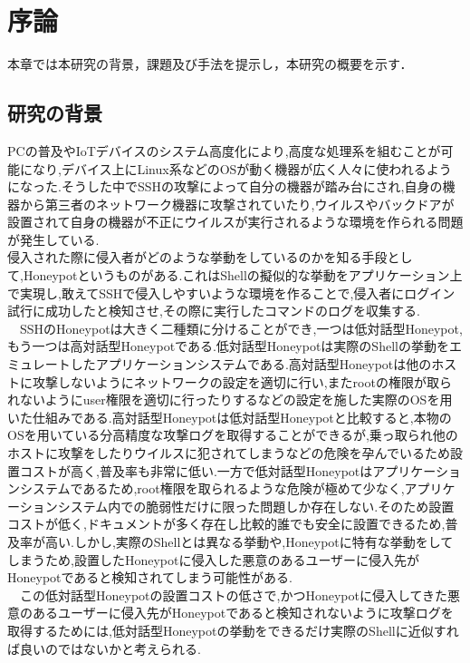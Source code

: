 \chapter{序論}
\label{introduction}

本章では本研究の背景，課題及び手法を提示し，本研究の概要を示す．

\section{研究の背景}
\label{introduction:haikei}

PCの普及やIoTデバイスのシステム高度化により,高度な処理系を組むことが可能になり,デバイス上にLinux系などのOSが動く機器が広く人々に使われるようになった.そうした中でSSHの攻撃によって自分の機器が踏み台にされ,自身の機器から第三者のネットワーク機器に攻撃されていたり,ウイルスやバックドアが設置されて自身の機器が不正にウイルスが実行されるような環境を作られる問題が発生している.\\
 侵入された際に侵入者がどのような挙動をしているのかを知る手段として,Honeypotというものがある.これはShellの擬似的な挙動をアプリケーション上で実現し,敢えてSSHで侵入しやすいような環境を作ることで,侵入者にログイン試行に成功したと検知させ,その際に実行したコマンドのログを収集する.\\
\ \ SSHのHoneypotは大きく二種類に分けることができ,一つは低対話型Honeypot,もう一つは高対話型Honeypotである.低対話型Honeypotは実際のShellの挙動をエミュレートしたアプリケーションシステムである.高対話型Honeypotは他のホストに攻撃しないようにネットワークの設定を適切に行い,またrootの権限が取られないようにuser権限を適切に行ったりするなどの設定を施した実際のOSを用いた仕組みである.高対話型Honeypotは低対話型Honeypotと比較すると,本物のOSを用いている分高精度な攻撃ログを取得することができるが,乗っ取られ他のホストに攻撃をしたりウイルスに犯されてしまうなどの危険を孕んでいるため設置コストが高く,普及率も非常に低い.一方で低対話型Honeypotはアプリケーションシステムであるため,root権限を取られるような危険が極めて少なく,アプリケーションシステム内での脆弱性だけに限った問題しか存在しない.そのため設置コストが低く,ドキュメントが多く存在し比較的誰でも安全に設置できるため,普及率が高い.しかし,実際のShellとは異なる挙動や,Honeypotに特有な挙動をしてしまうため,設置したHoneypotに侵入した悪意のあるユーザーに侵入先がHoneypotであると検知されてしまう可能性がある.\\
\ \ この低対話型Honeypotの設置コストの低さで,かつHoneypotに侵入してきた悪意のあるユーザーに侵入先がHoneypotであると検知されないように攻撃ログを取得するためには,低対話型Honeypotの挙動をできるだけ実際のShellに近似すれば良いのではないかと考えられる.\\
